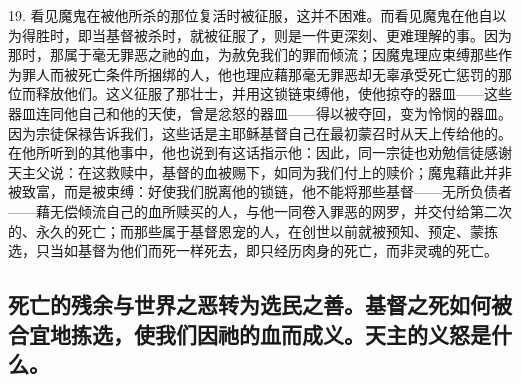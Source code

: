 19. 看见魔鬼在被他所杀的那位复活时被征服，这并不困难。而看见魔鬼在他自以为得胜时，即当基督被杀时，就被征服了，则是一件更深刻、更难理解的事。因为那时，那属于毫无罪恶之祂的血，为赦免我们的罪而倾流；因魔鬼理应束缚那些作为罪人而被死亡条件所捆绑的人，他也理应藉那毫无罪恶却无辜承受死亡惩罚的那位而释放他们。这义征服了那壮士，并用这锁链束缚他，使他掠夺的器皿——这些器皿连同他自己和他的天使，曾是忿怒的器皿——得以被夺回，变为怜悯的器皿。因为宗徒保禄告诉我们，这些话是主耶稣基督自己在最初蒙召时从天上传给他的。在他所听到的其他事中，他也说到有这话指示他：因此，同一宗徒也劝勉信徒感谢天主父说：在这救赎中，基督的血被赐下，如同为我们付上的赎价；魔鬼藉此并非被致富，而是被束缚：好使我们脱离他的锁链，他不能将那些基督——无所负债者——藉无偿倾流自己的血所赎买的人，与他一同卷入罪恶的网罗，并交付给第二次的、永久的死亡；而那些属于基督恩宠的人，在创世以前就被预知、预定、蒙拣选，只当如基督为他们而死一样死去，即只经历肉身的死亡，而非灵魂的死亡。\par


\subsection{死亡的残余与世界之恶转为选民之善。基督之死如何被合宜地拣选，使我们因祂的血而成义。天主的义怒是什么。}

